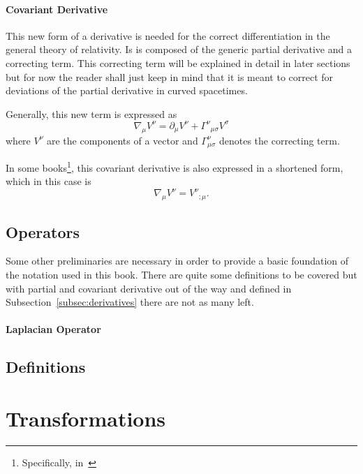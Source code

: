 \paragraph{Covariant Derivative}

This new form of a derivative is needed for the correct differentiation 
in the general theory of relativity. Is is composed of the generic 
partial derivative and a correcting term. This correcting term will 
be explained in detail in later sections but for now the reader shall 
just keep in mind that it is meant to correct for deviations of the 
partial derivative in curved spacetimes.

Generally, this new term is expressed as 
\begin{equation}
  \nabla_{\mu}V^{\nu} = \partial_{\mu}V^{\nu} + \Gamma^{\nu}_{\;\;\mu \sigma}V^{\sigma}
  \label{eq:covariant-derivative}
\end{equation}
where $V^{\nu}$ are the components of a vector and 
$\Gamma^{\nu}_{\mu \sigma}$ denotes the correcting term.

In some books\footnote{Specifically, in~\cite{}}, this covariant derivative 
is also expressed in a shortened form, which in this case is 
\begin{equation}
  \nabla_{\mu}V^{\nu} = V^{\nu}_{\;\;;\mu}.
  \label{eq:covariant-very-short}
\end{equation}

\subsection{Operators}
\label{subsec:operators}

Some other preliminaries are necessary in order to provide a basic foundation 
of the notation used in this book. There are quite some definitions to be 
covered but with partial and covariant derivative out of the way and defined
in Subsection~\ref{subsec:derivatives} there are not as many left.

\paragraph{Laplacian Operator}



\subsection{Definitions}
\label{subsec:definitions}

\section{Transformations}
\label{sec:transformations}

